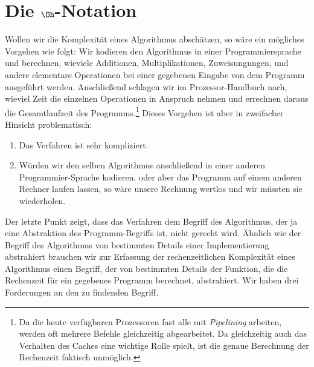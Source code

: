 \section{Die $\Oh$-Notation}
Wollen wir die Komplexit\"at eines Algorithmus absch\"atzen, so w\"are ein m\"ogliches Vorgehen
wie folgt: Wir kodieren den Algorithmus in einer Programmiersprache und berechnen,
wieviele Additionen, Multiplikationen, Zuweisungungen, und andere elementare Operationen
bei einer gegebenen Eingabe von dem Programm ausgef\"uhrt werden. Anschlie{\ss}end schlagen wir
im Prozessor-Handbuch nach, wieviel Zeit die einzelnen Operationen in Anspruch nehmen und
errechnen daraus die Gesamtlaufzeit des Programms.\footnote{
Da die heute verf\"ugbaren Prozessoren fast alle mit \emph{Pipelining} arbeiten, werden oft
mehrere Befehle gleichzeitig abgearbeitet. Da gleichzeitig auch das Verhalten des Caches
eine wichtige Rolle spielt, ist die genaue Berechnung der Rechenzeit faktisch unm\"oglich.}
Dieses Vorgehen ist aber in zweifacher Hinsicht problematisch:
\begin{enumerate}
\item Das Verfahren ist sehr kompliziert.
\item W\"urden wir den selben Algorithmus anschlie{\ss}end in einer anderen Programmier-Sprache
      kodieren, oder aber das Programm auf einem anderen Rechner laufen lassen, so w\"are
      unsere Rechnung wertlos und wir m\"ussten sie wiederholen.
\end{enumerate}
Der letzte Punkt zeigt, dass das Verfahren dem Begriff des Algorithmus, der ja eine
Abstraktion des Programm-Begriffs ist, nicht gerecht wird.  Ähnlich wie der Begriff des
Algorithmus von bestimmten Details einer Implementierung abstrahiert brauchen wir zur
Erfassung der rechenzeitlichen Komplexit\"at eines Algorithmus einen Begriff, der von
bestimmten Details der Funktion, die die Rechenzeit f\"ur ein gegebenes Programm berechnet,
abstrahiert.  Wir haben drei Forderungen an den zu findenden  Begriff.

